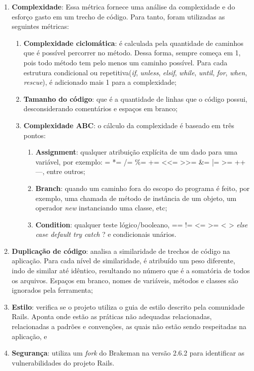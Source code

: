 \begin{enumerate}
	\item \textbf{Complexidade}: Essa métrica fornece uma análise da complexidade e do esforço gasto em um trecho de código. Para tanto, foram utilizadas as seguintes métricas:
	\begin{enumerate}
		\item \textbf{Complexidade ciclomática}: é calculada pela quantidade de caminhos que é possível percorrer no método. Dessa forma, sempre começa em 1, pois todo método tem pelo menos um caminho possível. Para cada estrutura condicional ou repetitiva(\textit{if}, \textit{unless}, \textit{elsif}, \textit{while}, \textit{until}, \textit{for}, \textit{when}, \textit{rescue}), é adicionado mais 1 para a complexidade;
		\item \textbf{Tamanho do código}: que é a quantidade de linhas que o código possui, desconsiderando comentários e espaços em branco;
		\item \textbf{Complexidade ABC}: o cálculo da complexidade é baseado em três pontos:
		\begin{enumerate}
			\item \textbf{Assignment}: qualquer atribuição explícita de um dado para uma variável, por exemplo: = *= /= \%= += <<= >>= \&= |= >= ++ —, entre outros;
		    \item \textbf{Branch}: quando um caminho fora do escopo do programa é feito, por exemplo, uma chamada de método de instância de um objeto, um operador \textit{new} instanciando uma classe, etc;
    		\item \textbf{Condition}: qualquer teste lógico/booleano, == != <= >= < > \textit{else case default try catch} ? e condicionais unários.
		\end{enumerate}
	\end{enumerate}
	\item \textbf{Duplicação de código}: analisa a similaridade de trechos de código na aplicação. Para cada nível de similaridade, é atribuído um peso diferente, indo de similar até idêntico, resultando no número que é a somatória de todos os arquivos. Espaços em branco, nomes de variáveis, métodos e classes são ignorados pela ferramenta;
	\item \textbf{Estilo}: verifica se o projeto utiliza o guia de estilo descrito pela comunidade Rails. Aponta onde estão as práticas não adequadas relacionadas, relacionadas a padrões e convenções, as quais não estão sendo respeitadas na aplicação, e
	\item \textbf{Segurança}: utiliza um \textit{fork} do Brakeman na versão 2.6.2 para identificar as vulnerabilidades do projeto Rails.
\end{enumerate}

